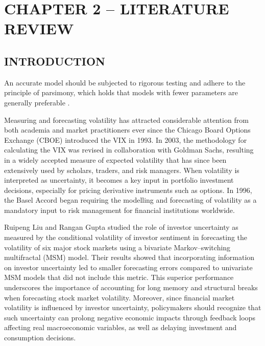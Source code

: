 \documentclass[12pt,a4paper]{report}
\numberwithin{equation}{section}
\begin{document}
\hypertarget{chapter--2--literature--review}{%
\chapter{\texorpdfstring{\textbf{CHAPTER 2 -- LITERATURE
REVIEW}}{CHAPTER 2 -- LITERATURE REVIEW}}\label{chapter--2--literature--review}}

\hypertarget{introduction--1}{%
\section{\texorpdfstring{\textbf{
INTRODUCTION}}{INTRODUCTION}}\label{introduction--1}}

An accurate model should be subjected to rigorous testing and adhere to
the principle of parsimony, which holds that models with fewer
parameters are generally preferable \cite{taylor2008modelling_10}.

Measuring and forecasting volatility has attracted considerable
attention from both academia and market practitioners ever since the
Chicago Board Options Exchange (CBOE) introduced the VIX in 1993. In
2003, the methodology for calculating the VIX was revised in
collaboration with Goldman Sachs, resulting in a widely accepted measure
of expected volatility that has since been extensively used by scholars,
traders, and risk managers. When volatility is interpreted as
uncertainty, it becomes a key input in portfolio investment decisions,
especially for pricing derivative instruments such as options. In 1996,
the Basel Accord began requiring the modelling and forecasting of
volatility as a mandatory input to risk management for financial
institutions worldwide.

Ruipeng Liu and Rangan Gupta \cite{liu2022investors_11} studied the role of investor
uncertainty as measured by the conditional volatility of investor
sentiment in forecasting the volatility of six major stock markets using
a bivariate Markov--switching multifractal (MSM) model. Their results
showed that incorporating information on investor uncertainty led to
smaller forecasting errors compared to univariate MSM models that did
not include this metric. This superior performance underscores the
importance of accounting for long memory and structural breaks when
forecasting stock market volatility. Moreover, since financial market
volatility is influenced by investor uncertainty, policymakers should
recognize that such uncertainty can prolong negative economic impacts
through feedback loops affecting real macroeconomic variables, as well
as delaying investment and consumption decisions.
\end{document}
